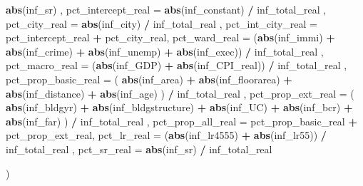 \documentclass[
]{article}
\newenvironment{Shaded}{\begin{snugshade}}{\end{snugshade}}
\newcommand{\DataTypeTok}[1]{\textcolor[rgb]{0.13,0.29,0.53}{#1}}
\newcommand{\KeywordTok}[1]{\textcolor[rgb]{0.13,0.29,0.53}{\textbf{#1}}}
\newcommand{\NormalTok}[1]{#1}
\newcommand{\OperatorTok}[1]{\textcolor[rgb]{0.81,0.36,0.00}{\textbf{#1}}}
\newcommand{\StringTok}[1]{\textcolor[rgb]{0.31,0.60,0.02}{#1}}
\begin{document}
\begin{Shaded}
\begin{Highlighting}[]
{\StringTok{      }\KeywordTok{abs}\NormalTok{(inf_sr) ,}
    \DataTypeTok{pct_intercept_real =} \KeywordTok{abs}\NormalTok{(inf_constant) }\OperatorTok{/}\StringTok{ }\NormalTok{inf_total_real ,}
    \DataTypeTok{pct_city_real =} \KeywordTok{abs}\NormalTok{(inf_city) }\OperatorTok{/}\StringTok{ }\NormalTok{inf_total_real ,}
    \DataTypeTok{pct_int_city_real =}\NormalTok{ pct_intercept_real }\OperatorTok{+}\StringTok{ }\NormalTok{pct_city_real,}
    \DataTypeTok{pct_ward_real =}\NormalTok{ (}\KeywordTok{abs}\NormalTok{(inf_immi) }\OperatorTok{+}\StringTok{ }\KeywordTok{abs}\NormalTok{(inf_crime) }\OperatorTok{+}\StringTok{ }\KeywordTok{abs}\NormalTok{(inf_unemp) }\OperatorTok{+}
\StringTok{                       }\KeywordTok{abs}\NormalTok{(inf_exec)) }\OperatorTok{/}\StringTok{ }\NormalTok{inf_total_real ,}
    \DataTypeTok{pct_macro_real =}\NormalTok{ (}\KeywordTok{abs}\NormalTok{(inf_GDP) }\OperatorTok{+}\StringTok{ }\KeywordTok{abs}\NormalTok{(inf_CPI_real)) }\OperatorTok{/}\StringTok{ }\NormalTok{inf_total_real ,}
    \DataTypeTok{pct_prop_basic_real =}\NormalTok{ (}
      \KeywordTok{abs}\NormalTok{(inf_area) }\OperatorTok{+}\StringTok{ }\KeywordTok{abs}\NormalTok{(inf_floorarea) }\OperatorTok{+}
\StringTok{        }\KeywordTok{abs}\NormalTok{(inf_distance) }\OperatorTok{+}\StringTok{ }\KeywordTok{abs}\NormalTok{(inf_age)}
\NormalTok{    ) }\OperatorTok{/}\StringTok{ }\NormalTok{inf_total_real ,}
    \DataTypeTok{pct_prop_ext_real =}\NormalTok{ (}
      \KeywordTok{abs}\NormalTok{(inf_bldgyr) }\OperatorTok{+}\StringTok{ }\KeywordTok{abs}\NormalTok{(inf_bldgstructure) }\OperatorTok{+}\StringTok{ }\KeywordTok{abs}\NormalTok{(inf_UC) }\OperatorTok{+}
\StringTok{        }\KeywordTok{abs}\NormalTok{(inf_bcr) }\OperatorTok{+}\StringTok{ }\KeywordTok{abs}\NormalTok{(inf_far)}
\NormalTok{    ) }\OperatorTok{/}\StringTok{ }\NormalTok{inf_total_real ,}
    \DataTypeTok{pct_prop_all_real =}\NormalTok{ pct_prop_basic_real }\OperatorTok{+}\StringTok{ }\NormalTok{pct_prop_ext_real,}
    \DataTypeTok{pct_lr_real =}\NormalTok{ (}\KeywordTok{abs}\NormalTok{(inf_lr4555) }\OperatorTok{+}\StringTok{ }\KeywordTok{abs}\NormalTok{(inf_lr55)) }\OperatorTok{/}\StringTok{ }\NormalTok{inf_total_real ,}
    \DataTypeTok{pct_sr_real =} \KeywordTok{abs}\NormalTok{(inf_sr) }\OperatorTok{/}\StringTok{ }\NormalTok{inf_total_real}
    
\NormalTok{  )}

}
\end{Highlighting}
\end{Shaded}
\end{document}
